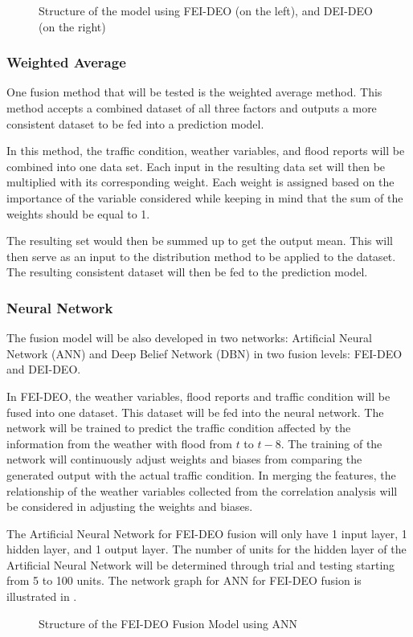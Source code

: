 \begin{figure}[h]
	\centering
	\captionsetup{justification=centering}
	\caption{Structure of the model using FEI-DEO (on the left), and DEI-DEO (on the right)}
	\label{fig:feideo_vs_deideo}
\end{figure}

\subsubsection{Weighted Average} 
One fusion method that will be tested is the weighted average method. This method accepts a combined dataset of all three factors and outputs a more consistent dataset to be fed into a prediction model.

In this method, the traffic condition, weather variables, and flood reports will be combined into one data set. Each input in the resulting data set will then be multiplied with its corresponding weight. Each weight is assigned based on the importance of the variable considered while keeping in mind that the sum of the weights should be equal to 1. 

The resulting set would then be summed up to get the output mean. This will then serve as an input to the distribution method to be applied to the dataset. The resulting consistent dataset will then be fed to the prediction model.

\subsubsection{Neural Network}
The fusion model will be also developed in two networks: Artificial Neural Network (ANN) and Deep Belief Network (DBN) in two fusion levels: FEI-DEO and DEI-DEO. 

In FEI-DEO, the weather variables, flood reports and traffic condition will be fused into one dataset. This dataset will be fed into the neural network. The network will be trained to predict the traffic condition affected by the information from the weather with flood from $t$ to $t-8$. The training of the network will continuously adjust weights and biases from comparing the generated output with the actual traffic condition. In merging the features, the relationship of the weather variables collected from the correlation analysis will be considered in adjusting the weights and biases. 

The Artificial Neural Network for FEI-DEO fusion will only have 1 input layer, 1 hidden layer, and 1 output layer. The number of units for the hidden layer of the Artificial Neural Network will be determined through trial and testing starting from 5 to 100 units. The network graph for ANN for FEI-DEO fusion is illustrated in . 
\begin{figure}[h]
	\centering
	\captionsetup{justification=centering}
	\caption{Structure of the FEI-DEO Fusion Model using ANN}
	\label{fig:feideo_ann}
\end{figure}

